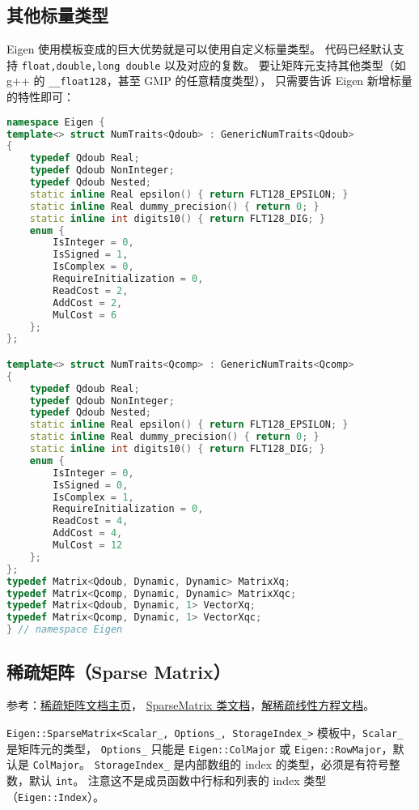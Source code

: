 \subsection{其他标量类型}
Eigen 使用模板变成的巨大优势就是可以使用自定义标量类型。 代码已经默认支持 \verb|float,double,long double| 以及对应的复数。 要让矩阵元支持其他类型（如 g++ 的 \verb|__float128|，甚至 GMP 的任意精度类型）， 只需要告诉 Eigen 新增标量的特性即可：
\begin{lstlisting}[language=cpp]
namespace Eigen {
template<> struct NumTraits<Qdoub> : GenericNumTraits<Qdoub>
{
    typedef Qdoub Real;
    typedef Qdoub NonInteger;
    typedef Qdoub Nested;
    static inline Real epsilon() { return FLT128_EPSILON; }
    static inline Real dummy_precision() { return 0; }
    static inline int digits10() { return FLT128_DIG; }
    enum {
        IsInteger = 0,
        IsSigned = 1,
        IsComplex = 0,
        RequireInitialization = 0,
        ReadCost = 2,
        AddCost = 2,
        MulCost = 6
    };
};

template<> struct NumTraits<Qcomp> : GenericNumTraits<Qcomp>
{
    typedef Qdoub Real;
    typedef Qdoub NonInteger;
    typedef Qdoub Nested;
    static inline Real epsilon() { return FLT128_EPSILON; }
    static inline Real dummy_precision() { return 0; }
    static inline int digits10() { return FLT128_DIG; }
    enum {
        IsInteger = 0,
        IsSigned = 0,
        IsComplex = 1,
        RequireInitialization = 0,
        ReadCost = 4,
        AddCost = 4,
        MulCost = 12
    };
};
typedef Matrix<Qdoub, Dynamic, Dynamic> MatrixXq;
typedef Matrix<Qcomp, Dynamic, Dynamic> MatrixXqc;
typedef Matrix<Qdoub, Dynamic, 1> VectorXq;
typedef Matrix<Qcomp, Dynamic, 1> VectorXqc;
} // namespace Eigen
\end{lstlisting}


\subsection{稀疏矩阵（Sparse Matrix）}

参考：\href{https://eigen.tuxfamily.org/dox/group__TutorialSparse.html}{稀疏矩阵文档主页}， \href{https://eigen.tuxfamily.org/dox/classEigen_1_1SparseMatrix.html}{SparseMatrix 类文档}，\href{https://eigen.tuxfamily.org/dox/group__TopicSparseSystems.html}{解稀疏线性方程文档}。

\verb|Eigen::SparseMatrix<Scalar_, Options_, StorageIndex_>| 模板中，\verb|Scalar_| 是矩阵元的类型， \verb|Options_| 只能是 \verb|Eigen::ColMajor| 或 \verb|Eigen::RowMajor|，默认是 \verb|ColMajor|。 \verb|StorageIndex_| 是内部数组的 index 的类型，必须是有符号整数，默认 \verb|int|。 注意这不是成员函数中行标和列表的 index 类型（\verb|Eigen::Index|）。

